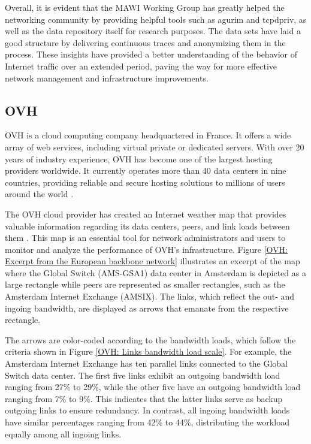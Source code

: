 \documentclass[sigconf,authorversion,nonacm]{acmart}
\begin{document}
Overall, it is evident that the MAWI Working Group has greatly helped the networking community by providing helpful tools such as agurim and tcpdpriv, as well as the data repository itself for research purposes. The data sets have laid a good structure by delivering continuous traces and anonymizing them in the process. These insights have provided a better understanding of the behavior of Internet traffic over an extended period, paving the way for more effective network management and infrastructure improvements.

\subsection{OVH}
OVH is a cloud computing company headquartered in France. It offers a wide array of web services, including virtual private or dedicated servers. With over 20 years of industry experience, OVH has become one of the largest hosting providers worldwide. It currently operates more than 40 data centers in nine countries, providing reliable and secure hosting solutions to millions of users around the world \cite{ovhcloudwebsite}.

The OVH cloud provider has created an Internet weather map that provides valuable information regarding its data centers, peers, and link loads between them \cite{ovhcloud}. This map is an essential tool for network administrators and users to monitor and analyze the performance of OVH's infrastructure. Figure \ref{OVH: Excerpt from the European backbone network} illustrates an excerpt of the map where the Global Switch (AMS-GSA1) data center in Amsterdam is depicted as a large rectangle while peers are represented as smaller rectangles, such as the Amsterdam Internet Exchange (AMSIX). The links, which reflect the out- and ingoing bandwidth, are displayed as arrows that emanate from the respective rectangle. 

The arrows are color-coded according to the bandwidth loads, which follow the criteria shown in Figure \ref{OVH: Links bandwidth load scale}. For example, the Amsterdam Internet Exchange has ten parallel links connected to the Global Switch data center. The first five links exhibit an outgoing bandwidth load ranging from 27\% to 29\%, while the other five have an outgoing bandwidth load ranging from 7\% to 9\%. This indicates that the latter links serve as backup outgoing links to ensure redundancy. In contrast, all ingoing bandwidth loads have similar percentages ranging from 42\% to 44\%, distributing the workload equally among all ingoing links. 
\end{document}
